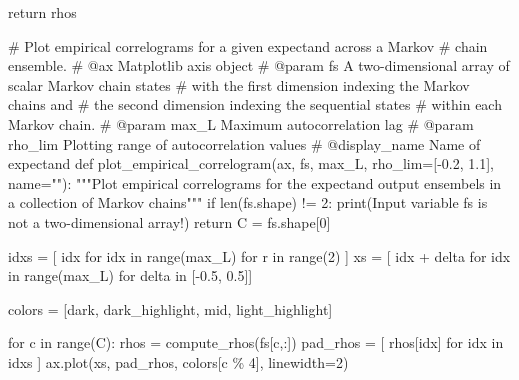 \documentclass[
  letterpaper,
  DIV=11,
  numbers=noendperiod]{scrartcl}
\newenvironment{Shaded}{\begin{snugshade}}{\end{snugshade}}
\newcommand{\BuiltInTok}[1]{\textcolor[rgb]{0.00,0.23,0.31}{#1}}
\newcommand{\CommentTok}[1]{\textcolor[rgb]{0.37,0.37,0.37}{#1}}
\newcommand{\ControlFlowTok}[1]{\textcolor[rgb]{0.00,0.23,0.31}{#1}}
\newcommand{\DecValTok}[1]{\textcolor[rgb]{0.68,0.00,0.00}{#1}}
\newcommand{\FloatTok}[1]{\textcolor[rgb]{0.68,0.00,0.00}{#1}}
\newcommand{\KeywordTok}[1]{\textcolor[rgb]{0.00,0.23,0.31}{#1}}
\newcommand{\NormalTok}[1]{\textcolor[rgb]{0.00,0.23,0.31}{#1}}
\newcommand{\OperatorTok}[1]{\textcolor[rgb]{0.37,0.37,0.37}{#1}}
\newcommand{\StringTok}[1]{\textcolor[rgb]{0.13,0.47,0.30}{#1}}
\begin{document}
\begin{Shaded}
\begin{Highlighting}[]
  \ControlFlowTok{return}\NormalTok{ rhos}

\CommentTok{\# Plot empirical correlograms for a given expectand across a Markov }
\CommentTok{\# chain ensemble.}
\CommentTok{\# @ax Matplotlib axis object}
\CommentTok{\# @param fs A two{-}dimensional array of scalar Markov chain states }
\CommentTok{\#           with the first dimension indexing the Markov chains and }
\CommentTok{\#           the second dimension indexing the sequential states }
\CommentTok{\#           within each Markov chain.}
\CommentTok{\# @param max\_L Maximum autocorrelation lag}
\CommentTok{\# @param rho\_lim Plotting range of autocorrelation values}
\CommentTok{\# @display\_name Name of expectand}
\KeywordTok{def}\NormalTok{ plot\_empirical\_correlogram(ax,}
\NormalTok{                               fs,}
\NormalTok{                               max\_L,}
\NormalTok{                               rho\_lim}\OperatorTok{=}\NormalTok{[}\OperatorTok{{-}}\FloatTok{0.2}\NormalTok{, }\FloatTok{1.1}\NormalTok{],}
\NormalTok{                               name}\OperatorTok{=}\StringTok{""}\NormalTok{):}
  \CommentTok{"""Plot empirical correlograms for the expectand output ensembels in a}
\CommentTok{     collection of Markov chains"""}
  \ControlFlowTok{if} \BuiltInTok{len}\NormalTok{(fs.shape) }\OperatorTok{!=} \DecValTok{2}\NormalTok{:}
    \BuiltInTok{print}\NormalTok{(}\StringTok{\textquotesingle{}Input variable \textasciigrave{}fs\textasciigrave{} is not a two{-}dimensional array!\textquotesingle{}}\NormalTok{)}
    \ControlFlowTok{return}
\NormalTok{  C }\OperatorTok{=}\NormalTok{ fs.shape[}\DecValTok{0}\NormalTok{]}
  
\NormalTok{  idxs }\OperatorTok{=}\NormalTok{ [ idx }\ControlFlowTok{for}\NormalTok{ idx }\KeywordTok{in} \BuiltInTok{range}\NormalTok{(max\_L) }\ControlFlowTok{for}\NormalTok{ r }\KeywordTok{in} \BuiltInTok{range}\NormalTok{(}\DecValTok{2}\NormalTok{) ]}
\NormalTok{  xs }\OperatorTok{=}\NormalTok{ [ idx }\OperatorTok{+}\NormalTok{ delta }\ControlFlowTok{for}\NormalTok{ idx }\KeywordTok{in} \BuiltInTok{range}\NormalTok{(max\_L) }\ControlFlowTok{for}\NormalTok{ delta }\KeywordTok{in}\NormalTok{ [}\OperatorTok{{-}}\FloatTok{0.5}\NormalTok{, }\FloatTok{0.5}\NormalTok{]]}
  
\NormalTok{  colors }\OperatorTok{=}\NormalTok{ [dark, dark\_highlight, mid, light\_highlight]}
  
  \ControlFlowTok{for}\NormalTok{ c }\KeywordTok{in} \BuiltInTok{range}\NormalTok{(C):}
\NormalTok{    rhos }\OperatorTok{=}\NormalTok{ compute\_rhos(fs[c,:])}
\NormalTok{    pad\_rhos }\OperatorTok{=}\NormalTok{ [ rhos[idx] }\ControlFlowTok{for}\NormalTok{ idx }\KeywordTok{in}\NormalTok{ idxs ]}
\NormalTok{    ax.plot(xs, pad\_rhos, colors[c }\OperatorTok{\%} \DecValTok{4}\NormalTok{], linewidth}\OperatorTok{=}\DecValTok{2}\NormalTok{)}
  

\end{Highlighting}
\end{Shaded}
\end{document}
